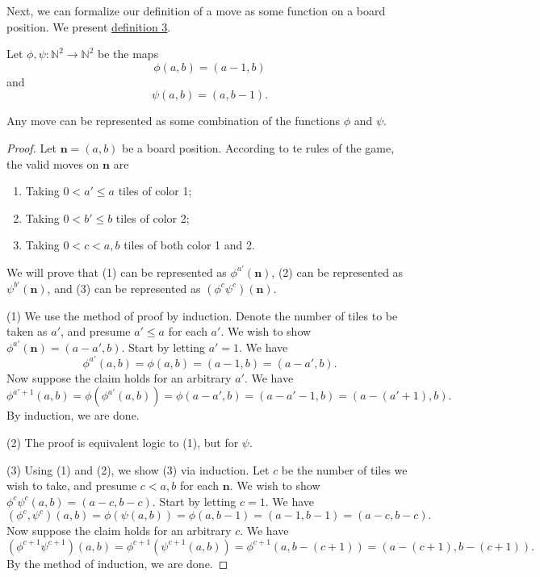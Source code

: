 \documentclass[11pt, letterpaper]{article}
\begin{document}
Next, we can formalize our definition of a move as some function on a board position. We present \hyperref[dfn:2]{definition 3}.
\begin{definition}[Moves]\label{dfn:3}
	Let $\phi ,\psi : \mathbb{N}^2 \to \mathbb{N}^2$ be the maps
	\[
		\phi (a,b)=(a-1,b)
	\]
	and
	\[
		\psi (a,b)=(a,b-1)
	.\]
\end{definition}
\begin{proposition}
	Any move can be represented as some combination of the functions $\phi $ and $\psi $.
\end{proposition}
\begin{proof}
	Let $\mathbf{n}=(a,b)$ be a board position. According to te rules of the game, the valid moves on $\mathbf{n}$ are
	\begin{enumerate}
		\item Taking $0<a'\leq a$ tiles of color 1;
		\item Taking $0<b'\leq b$ tiles of color 2;
		\item Taking $0<c<a,b$ tiles of both color 1 and 2.
	\end{enumerate}
	We will prove that (1) can be represented as $\phi ^{a'}(\mathbf{n})$, (2) can be represented as $\psi ^{b'}(\mathbf{n})$, and (3) can be represented as $\left( \phi ^c\psi ^c \right) (\mathbf{n})$.

	(1) We use the method of proof by induction. Denote the number of tiles to be taken as $a'$, and presume $a'\leq a $ for each $a'$. We wish to show $\phi ^{a'}(\mathbf{n})=\left( a-a',b \right) $. Start by letting $a'=1$. We have
	\[
		\phi ^{a'}(a,b)=\phi (a,b)=(a-1,b)=\left( a-a',b \right) 
	.\]
	Now suppose the claim holds for an arbitrary $a'$. We have
	\[
		\phi ^{a'+1}(a,b)=\phi \left( \phi ^{a'}(a,b) \right) =\phi \left(a-a',b\right)=\left( a-a'-1,b \right) =\left( a-(a'+1),b \right) 
	.\]
	By induction, we are done.

	(2) The proof is equivalent logic to (1), but for $\psi $.

	(3) Using (1) and (2), we show (3) via induction. Let $c$ be the number of tiles we wish to take, and presume $c<a,b$ for each $\mathbf{n}$. We wish to show $\phi ^c\psi ^c(a,b)=(a-c,b-c)$. Start by letting $c=1$. We have
	\[
		\left( \phi ^c,\psi ^c \right) (a,b)=\phi (\psi (a,b))=\phi (a,b-1)=(a-1,b-1)=(a-c,b-c)
	.\]
	Now suppose the claim holds for an arbitrary $c$. We have
	\[
		\left( \phi ^{c+1}\psi ^{c+1} \right) (a,b)=\phi ^{c+1}\left( \psi ^{c+1}(a,b) \right) =\phi ^{c+1}(a,b-(c+1))=(a-(c+1),b-(c+1))
	.\]
	By the method of induction, we are done.
\end{proof}
\end{document}
